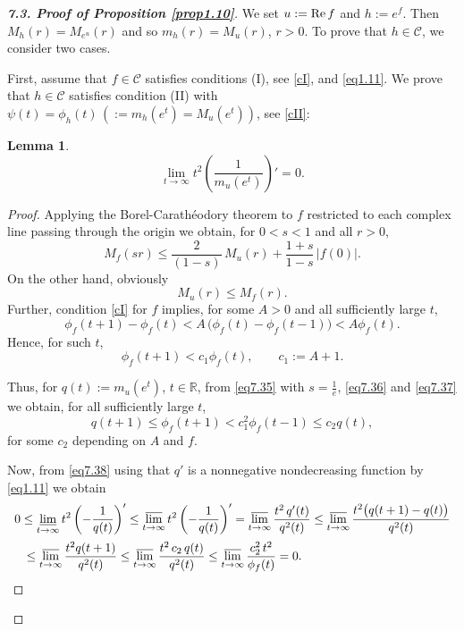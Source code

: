 \documentclass[11pt, oneside]{amsart}
\newtheorem{Lm}[Th]{Lemma}
\begin{document}
\smallskip
\begin{proof}[{\bf 7.3. Proof of Proposition \ref{prop1.10}}]
We set $u:={\rm Re}\, f$ and $h:=e^f$. Then $M_h(r)=M_{e^u}(r)$ and so $m_h(r)=M_u(r)$,
$r>0$. To prove that $h\in\mathscr C$, we consider two cases.

First, assume that $f\in\mathscr C$ satisfies conditions (I), see \eqref{cI}, and \eqref{eq1.11}. We prove that 
$h\in\mathscr C$ satisfies condition (II) with $\psi(t)=\phi_{h}(t)\, (:=m_h(e^t)=M_u(e^t))$, see \eqref{cII}: 
\begin{Lm}\label{lem7.2}
\[
\lim_{t\rightarrow\infty}t^2\left(\frac{1}{m_{u}(e^t)}\right)'=0.
\]
\end{Lm}
\begin{proof}
Applying the Borel-Carath\'eodory theorem to $f$ restricted to each complex line passing through the origin we obtain, for $0<s<1$ and all $r>0$,
\begin{equation}\label{eq7.35}
M_f(sr)\le \frac{2}{(1-s)}\,M_u(r)+\frac{1+s}{1-s}\, |f(0)|.
\end{equation}
On the other hand, obviously
\begin{equation}\label{eq7.36}
M_u(r)\le M_f(r).
\end{equation}
Further, condition \eqref{cI} for $f$ implies, for some $A>0$ and all sufficiently large $t$,
\[
\phi_f(t+1)-\phi_f(t)<A\,\bigl(\phi_f(t)-\phi_f(t-1)\bigr)<A\phi_f(t).
\]
Hence, for such $t$,
\begin{equation}\label{eq7.37}
\phi_f(t+1)<c_1 \phi_f(t),\qquad c_1:=A+1.
\end{equation}

Thus, for $q(t):= m_{u}(e^t)$, $t\in\mathbb R$, from \eqref{eq7.35} with $s=\frac 1e$, \eqref{eq7.36} and \eqref{eq7.37} we obtain, for all sufficiently large $t$,
\begin{equation}\label{eq7.38}
q(t+1)\le \phi_f(t+1)<c_1^2\phi_f(t-1)\le c_2q(t),
\end{equation}
for some $c_2$ depending on $A$ and $f$.

Now, from \eqref{eq7.38} using that $q'$ is a nonnegative nondecreasing function by \eqref{eq1.11} we obtain
\[
\begin{array}{l}
\displaystyle
0\le \varliminf_{t\rightarrow\infty}t^2\left(-\frac{1}{ q(t)}\right)'\le\varlimsup_{t\rightarrow\infty}t^2\left(-\frac{1}{ q(t)}\right)'= \varlimsup_{t\rightarrow\infty}\frac{t^2\, q'(t)}{q^2(t)}\le  \varlimsup_{t\rightarrow\infty}\frac{t^2\bigl(q(t+1)-q(t)\bigr)}{q^2(t)}\medskip\\
\displaystyle \quad\le \varlimsup_{t\rightarrow\infty}\frac{t^2 q(t+1)}{  q^2(t)}\le\varlimsup_{t\rightarrow\infty}\frac{t^2\,c_2\,q(t)}{q^2(t)}\le\varlimsup_{t\rightarrow\infty}\frac{c_2^2 \,t^2}{\phi_f(t)}=0.
\end{array}
\]
\end{proof}


\end{proof}
\end{document}
